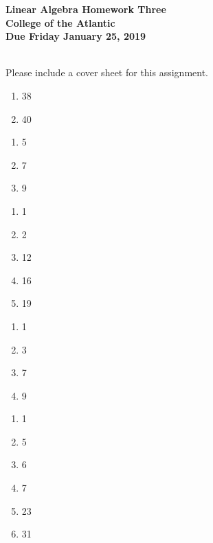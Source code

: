 \documentclass[11pt]{article}
\begin{document}
\pagestyle{empty}
 
\begin{center}
{\Large {\bf Linear Algebra Homework Three}}\\
\medskip
{\large {\bf College of the Atlantic}}\\
\medskip
{\large {\bf Due Friday January 25, 2019}}\\
\medskip
\end{center}

\\


\noindent Please include a cover sheet for this assignment.\\

\begin{enumerate}
\setlength{\itemsep}{-1mm}
\item 38
  \item 40 

\end{enumerate}

\begin{enumerate}
  \setlength{\itemsep}{-1mm}
\item 5
\item 7
\item 9
\end{enumerate}

\begin{enumerate}
  \setlength{\itemsep}{-1mm}
\item 1
\item 2
\item 12
\item 16
\item 19
\end{enumerate}


\begin{enumerate}
\setlength{\itemsep}{-1mm}
\item 1
\item 3
\item 7
\item 9
\end{enumerate}

\begin{enumerate}
\setlength{\itemsep}{-1mm}
\item 1
\item 5
\item 6
\item 7
\item 23
\item 31
\end{enumerate}
\end{document}
